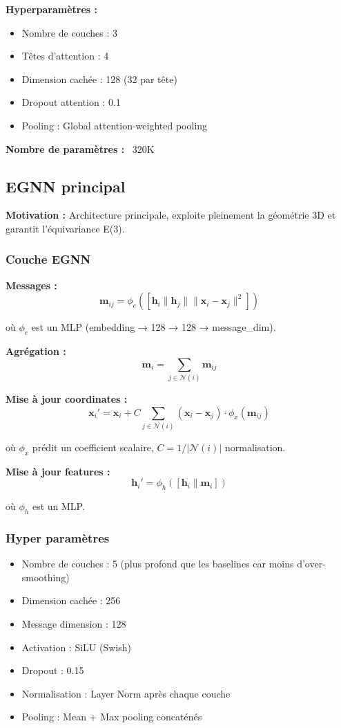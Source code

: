 \textbf{Hyperparamètres :}
\begin{itemize}
    \item Nombre de couches : 3
    \item Têtes d'attention : 4
    \item Dimension cachée : 128 (32 par tête)
    \item Dropout attention : 0.1
    \item Pooling : Global attention-weighted pooling
\end{itemize}

\textbf{Nombre de paramètres :} ~320K

\subsection{EGNN principal}

\textbf{Motivation :}
Architecture principale, exploite pleinement la géométrie 3D et garantit l'équivariance E(3).

\subsubsection{Couche EGNN}

\textbf{Messages :}
\[
\mathbf{m}_{ij} = \phi_e\left([\mathbf{h}_i \| \mathbf{h}_j \| \|\mathbf{x}_i - \mathbf{x}_j\|^2]\right)
\]

où $\phi_e$ est un MLP (embedding → 128 → 128 → message\_dim).

\textbf{Agrégation :}
\[
\mathbf{m}_i = \sum_{j \in \mathcal{N}(i)} \mathbf{m}_{ij}
\]

\textbf{Mise à jour coordinates :}
\[
\mathbf{x}_i' = \mathbf{x}_i + C \sum_{j \in \mathcal{N}(i)} (\mathbf{x}_i - \mathbf{x}_j) \cdot \phi_x(\mathbf{m}_{ij})
\]

où $\phi_x$ prédit un coefficient scalaire, $C = 1/|\mathcal{N}(i)|$ normalisation.

\textbf{Mise à jour features :}
\[
\mathbf{h}_i' = \phi_h([\mathbf{h}_i \| \mathbf{m}_i])
\]

où $\phi_h$ est un MLP.

\subsubsection{Hyper paramètres}

\begin{itemize}
    \item Nombre de couches : 5 (plus profond que les baselines car moins d'over-smoothing)
    \item Dimension cachée : 256
    \item Message dimension : 128
    \item Activation : SiLU (Swish)
    \item Dropout : 0.15
    \item Normalisation : Layer Norm après chaque couche
    \item Pooling : Mean + Max pooling concaténés
\end{itemize}

